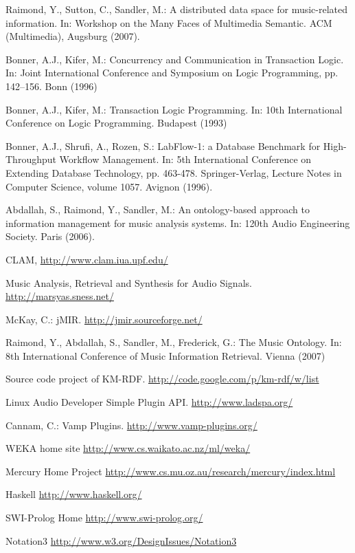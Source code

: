 \documentclass[runningheads]{llncs}
\begin{document}
\begin{thebibliography}{4}

 Raimond, Y., Sutton, C., Sandler, M.: A distributed data space for music-related information. In: Workshop on the Many Faces of Multimedia Semantic. ACM (Multimedia), Augsburg (2007).

 Bonner, A.J., Kifer, M.: Concurrency and Communication in Transaction Logic. In: Joint International Conference and Symposium on Logic Programming, pp. 142--156. Bonn (1996)

 Bonner, A.J., Kifer, M.: Transaction Logic Programming. In: 10th International Conference on Logic Programming. Budapest (1993)

 Bonner, A.J., Shrufi, A., Rozen, S.: LabFlow-1: a Database Benchmark for High-Throughput Workflow Management. In: 5th International Conference on Extending Database Technology, pp. 463-478. Springer-Verlag, Lecture Notes in Computer Science, volume 1057. Avignon (1996).

 Abdallah, S., Raimond, Y., Sandler, M.: An ontology-based approach to information management for music analysis systems. In: 120th Audio Engineering Society. Paris (2006).

 CLAM, \url{http://www.clam.iua.upf.edu/}

 Music Analysis, Retrieval and Synthesis for Audio Signals. \url{http://marsyas.sness.net/}

 McKay, C.: jMIR. \url{http://jmir.sourceforge.net/}

 Raimond, Y., Abdallah, S., Sandler, M., Frederick, G.: The Music Ontology. In: 8th International Conference of Music Information Retrieval. Vienna (2007)

 Source code project of KM-RDF. \url{http://code.google.com/p/km-rdf/w/list}

 Linux Audio Developer Simple Plugin API. \url{http://www.ladspa.org/}

 Cannam, C.: Vamp Plugins. \url{http://www.vamp-plugins.org/}

 WEKA home site \url{http://www.cs.waikato.ac.nz/ml/weka/}

 Mercury Home Project \url{http://www.cs.mu.oz.au/research/mercury/index.html}

 Haskell \url{http://www.haskell.org/}

 SWI-Prolog Home \url{http://www.swi-prolog.org/}

 Notation3 \url{http://www.w3.org/DesignIssues/Notation3}

\end{thebibliography}
\end{document}
